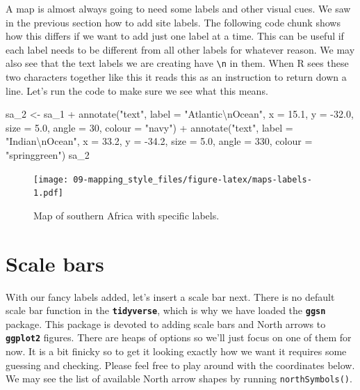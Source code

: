 \documentclass[
]{book}
\newenvironment{Shaded}{\begin{snugshade}}{\end{snugshade}}
\newcommand{\AttributeTok}[1]{\textcolor[rgb]{0.77,0.63,0.00}{#1}}
\newcommand{\DecValTok}[1]{\textcolor[rgb]{0.00,0.00,0.81}{#1}}
\newcommand{\FloatTok}[1]{\textcolor[rgb]{0.00,0.00,0.81}{#1}}
\newcommand{\FunctionTok}[1]{\textcolor[rgb]{0.00,0.00,0.00}{#1}}
\newcommand{\NormalTok}[1]{#1}
\newcommand{\OtherTok}[1]{\textcolor[rgb]{0.56,0.35,0.01}{#1}}
\newcommand{\SpecialCharTok}[1]{\textcolor[rgb]{0.00,0.00,0.00}{#1}}
\newcommand{\StringTok}[1]{\textcolor[rgb]{0.31,0.60,0.02}{#1}}
\begin{document}
A map is almost always going to need some labels and other visual cues. We saw in the previous section how to add site labels. The following code chunk shows how this differs if we want to add just one label at a time. This can be useful if each label needs to be different from all other labels for whatever reason. We may also see that the text labels we are creating have \texttt{\textbackslash{}n} in them. When R sees these two characters together like this it reads this as an instruction to return down a line. Let's run the code to make sure we see what this means.

\begin{Shaded}
\begin{Highlighting}[]
\NormalTok{sa\_2 }\OtherTok{\textless{}{-}}\NormalTok{ sa\_1 }\SpecialCharTok{+}
  \FunctionTok{annotate}\NormalTok{(}\StringTok{"text"}\NormalTok{, }\AttributeTok{label =} \StringTok{"Atlantic}\SpecialCharTok{\textbackslash{}n}\StringTok{Ocean"}\NormalTok{, }
           \AttributeTok{x =} \FloatTok{15.1}\NormalTok{, }\AttributeTok{y =} \SpecialCharTok{{-}}\FloatTok{32.0}\NormalTok{, }
           \AttributeTok{size =} \FloatTok{5.0}\NormalTok{, }
           \AttributeTok{angle =} \DecValTok{30}\NormalTok{, }
           \AttributeTok{colour =} \StringTok{"navy"}\NormalTok{) }\SpecialCharTok{+}
  \FunctionTok{annotate}\NormalTok{(}\StringTok{"text"}\NormalTok{, }\AttributeTok{label =} \StringTok{"Indian}\SpecialCharTok{\textbackslash{}n}\StringTok{Ocean"}\NormalTok{, }
           \AttributeTok{x =} \FloatTok{33.2}\NormalTok{, }\AttributeTok{y =} \SpecialCharTok{{-}}\FloatTok{34.2}\NormalTok{, }
           \AttributeTok{size =} \FloatTok{5.0}\NormalTok{, }
           \AttributeTok{angle =} \DecValTok{330}\NormalTok{, }
           \AttributeTok{colour =} \StringTok{"springgreen"}\NormalTok{)}
\NormalTok{sa\_2}
\end{Highlighting}
\end{Shaded}

\begin{figure}
\centering
\texttt{[image: 09-mapping\_style\_files/figure-latex/maps-labels-1.pdf]}
\caption{\label{fig:maps-labels}Map of southern Africa with specific labels.}
\end{figure}

\hypertarget{scale-bars}{%
\section{Scale bars}\label{scale-bars}}

With our fancy labels added, let's insert a scale bar next. There is no default scale bar function in the \textbf{\texttt{tidyverse}}, which is why we have loaded the \textbf{\texttt{ggsn}} package. This package is devoted to adding scale bars and North arrows to \textbf{\texttt{ggplot2}} figures. There are heaps of options so we'll just focus on one of them for now. It is a bit finicky so to get it looking exactly how we want it requires some guessing and checking. Please feel free to play around with the coordinates below. We may see the list of available North arrow shapes by running \texttt{northSymbols()}.
\end{document}
